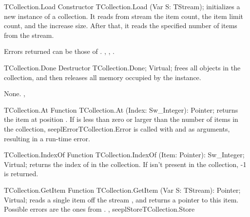 \begin{procedure}{TCollection.Load}
\Declaration
Constructor TCollection.Load (Var S: TStream);
\Description
{} initializes a new instance of a collection. It reads from stream
 the item count, the item limit count, and the increase size. After
that, it reads the specified number of items from the stream. 

\Errors
Errors returned can be those of .
\SeeAlso
{}, ,
.
\end{procedure}


\begin{procedure}{TCollection.Done}
\Declaration
Destructor TCollection.Done; Virtual;
\Description
{} frees all objects in the collection, and then releases all memory
occupied by the instance.

\Errors
None.
\SeeAlso
{}, 
\end{procedure}


\begin{function}{TCollection.At}
\Declaration
Function TCollection.At (Index: Sw\_Integer): Pointer;
\Description
{} returns the item at position .
\Errors
If  is less than zero or larger than the number of items
in the collection, seepl{Error}{TCollection.Error} is called with
 and  as arguments, resulting in a run-time
error.
\SeeAlso
{}
\end{function}


\begin{function}{TCollection.IndexOf}
\Declaration
Function TCollection.IndexOf (Item: Pointer): Sw\_Integer; Virtual;
\Description
{} returns the index of  in the collection. 
If  isn't present in the collection, -1 is returned.
\Errors
\SeeAlso
\end{function}


\begin{function}{TCollection.GetItem}
\Declaration
Function TCollection.GetItem (Var S: TStream): Pointer; Virtual;
\Description
{} reads a single item off the stream , and
returns a pointer to this item.
\Errors
Possible errors are the ones from .
\SeeAlso
{}, seepl{Store}{TCollection.Store}
\end{function}



